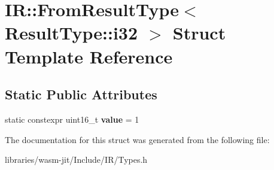 \hypertarget{struct_i_r_1_1_from_result_type_3_01_result_type_1_1i32_01_4}{}\section{IR\+:\+:From\+Result\+Type$<$ Result\+Type\+:\+:i32 $>$ Struct Template Reference}
\label{struct_i_r_1_1_from_result_type_3_01_result_type_1_1i32_01_4}
\subsection*{Static Public Attributes}
\begin{DoxyCompactItemize}
\item 
\mbox{\label{struct_i_r_1_1_from_result_type_3_01_result_type_1_1i32_01_4_ab43659799507b18be5c8be9b4565be60}} 
static constexpr uint16\+\_\+t {\bfseries value} = 1
\end{DoxyCompactItemize}


The documentation for this struct was generated from the following file\+:\begin{DoxyCompactItemize}
\item 
libraries/wasm-\/jit/\+Include/\+I\+R/Types.\+h\end{DoxyCompactItemize}
